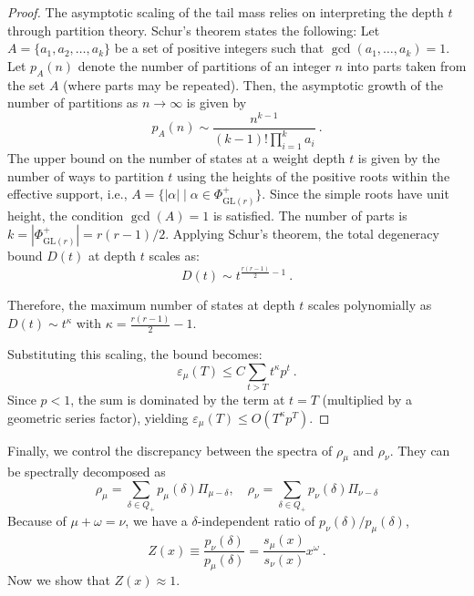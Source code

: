 \documentclass[11pt,letterpaper]{article}
\def\eps{\varepsilon}
\begin{document}
\begin{proof}
The asymptotic scaling of the tail mass relies on interpreting the depth $t$ through partition theory. Schur's theorem states the following: Let $A = \{a_1, a_2, \dots, a_k\}$ be a set of positive integers such that $\gcd(a_1, \dots, a_k) = 1$. Let $p_A(n)$ denote the number of partitions of an integer $n$ into parts taken from the set $A$ (where parts may be repeated). Then, the asymptotic growth of the number of partitions as $n \to \infty$ is given by
\begin{equation}
p_A(n) \sim \frac{n^{k-1}}{(k-1)! \prod_{i=1}^k a_i} \ .
\end{equation}
The upper bound on the number of states at a weight depth $t$ is given by the number of ways to partition $t$ using the heights of the positive roots within the effective support, i.e., $A = \{|\alpha| \mid \alpha \in \Phi^+_{\mathrm{GL}(r)}\}$. Since the simple roots have unit height, the condition $\gcd(A)=1$ is satisfied. The number of parts is $k = |\Phi^+_{\mathrm{GL}(r)}| = r(r-1)/2$. Applying Schur's theorem, the total degeneracy bound $D(t)$ at depth $t$ scales as:
\begin{equation}
D(t) \sim t^{\frac{r(r-1)}{2} - 1} \ .
\end{equation}

Therefore, the maximum number of states at depth $t$ scales polynomially as $D(t) \sim t^\kappa$ with $\kappa = \frac{r(r-1)}{2} - 1$.

Substituting this scaling, the bound becomes:
\begin{equation}
    \eps_\mu(T) \leq C \sum_{t > T} t^\kappa p^t \ .
\end{equation}
Since $p < 1$, the sum is dominated by the term at $t=T$ (multiplied by a geometric series factor), yielding $\eps_\mu(T) \leq O(T^\kappa p^T)$.
\end{proof}

Finally, we control the discrepancy between the spectra of $\rho_\mu$ and $\rho_\nu$. They can be spectrally decomposed as
\begin{equation}
    \rho_\mu = \sum_{\delta\in Q_+} p_\mu(\delta) \Pi_{\mu-\delta},\quad \rho_\nu = \sum_{\delta\in Q_+} p_\nu(\delta) \Pi_{\nu-\delta}
\end{equation}
Because of $\mu+\omega=\nu$, we have a $\delta$-independent ratio of $p_\nu(\delta)/p_\mu(\delta)$,
\begin{equation}
    Z(x)\equiv\frac{p_\nu(\delta)}{p_\mu(\delta)} = \frac{s_\mu(x)}{s_\nu(x)}x^\omega\ .
\end{equation}
Now we show that $Z(x)\approx 1$.
\end{document}
